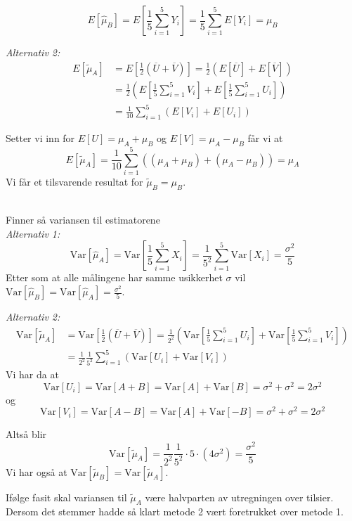 \documentclass[a4paper,11pt,norsk]{article}
\begin{document}
\begin{enumerate}
        \[
            E[\hat{\mu}_B] = E\left[\frac{1}{5} \sum_{i=1}^{5}{Y_i}\right] = \frac{1}{5} \sum_{i=1}^{5}{E[Y_i]} = \mu_B
        \]

        \textit{Alternativ 2:}
        \begin{align*}
            E[\tilde{\mu}_A] &= E\left[\frac{1}{2}\left(\overline{U} + \overline{V}\right)\right] = \frac{1}{2}\left(E[\overline{U}] + E[\overline{V}]\right) \\
                             &= \frac{1}{2}\left(E\left[\frac{1}{5}\sum_{i=1}^{5}{V_i}\right] + E\left[\frac{1}{5}\sum_{i=1}^{5}{U_i}\right]\right) \\ 
                             &= \frac{1}{10} \sum_{i=1}^{5}{\left(E[V_i] + E[U_i]\right)}
        \end{align*}

        Setter vi inn for $E[U] = \mu_A + \mu_B$ og $E[V] = \mu_A - \mu_B$ får vi at 
        \[
            E[\tilde{\mu}_A] = \frac{1}{10} \sum_{i=1}^{5}{\left((\mu_A + \mu_B) + (\mu_A - \mu_B)\right)} = \mu_A 
        \]
        Vi får et tilsvarende resultat for $\tilde{\mu}_B = \mu_B$.

        \hphantom{Heisann}\\
        Finner så variansen til estimatorene \\
        \textit{Alternativ 1:}
        \[
            \text{Var}[\hat{\mu}_A] = \text{Var}\left[\frac{1}{5} \sum_{i=1}^{5}{X_i}\right] = \frac{1}{5^2} \sum_{i=1}^{5}{\text{Var}[X_i]} = \frac{\sigma^2}{5}
        \]
        Etter som at alle målingene har samme usikkerhet $\sigma$ vil $\text{Var}[\hat{\mu}_B] = \text{Var}[\hat{\mu}_A] = \frac{\sigma^2}{5}$.

        \textit{Alternativ 2:}
        \begin{align*}
            \text{Var}[\tilde{\mu}_A] &= \text{Var}\left[\frac{1}{2}\left(\overline{U} + \overline{V}\right)\right] = \frac{1}{2^2} \left( \text{Var}\left[ \frac{1}{5} \sum_{i=1}^{5}{U_i}\right] + \text{Var}\left[ \frac{1}{5} \sum_{i=1}^{5}{V_i}\right] \right) \\
                                      &= \frac{1}{2^2} \frac{1}{5^2} \sum_{i=1}^{5} \left( \text{Var}[U_i] + \text{Var}[V_i] \right) 
        \end{align*}
        Vi har da at 
        \[
            \text{Var}[U_i] = \text{Var}[A + B] = \text{Var}[A] + \text{Var}[B] = \sigma^2 + \sigma^2 = 2\sigma^2
        \]
        og 
        \[
            \text{Var}[V_i] = \text{Var}[A - B] = \text{Var}[A] + \text{Var}[-B] = \sigma^2 + \sigma^2 = 2\sigma^2
        \]

        Altså blir
        \[
            \text{Var}[\tilde{\mu}_A] = \frac{1}{2^2}\frac{1}{5^2} \cdot 5 \cdot (4 \sigma^2) = \frac{\sigma^2}{5}
        \]
        Vi har også at $\text{Var}[\tilde{\mu}_B] = \text{Var}[\tilde{\mu}_A]$.

        Ifølge fasit skal variansen til $\tilde{\mu}_A$ være halvparten av utregningen over tilsier. Dersom det stemmer
        hadde så klart metode 2 vært foretrukket over metode 1.
\end{enumerate}
\end{document}
